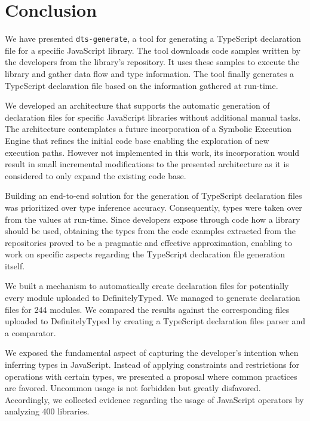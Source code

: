 \chapter{Conclusion}\label{chap:conclusion}

We have presented \texttt{dts-generate}, a tool for generating a TypeScript declaration file for a specific JavaScript library. The tool downloads code samples written by the developers from the library's repository. It uses these samples to execute the library and gather data flow and type information. The tool finally generates a TypeScript declaration file based on the information gathered at run-time.

We developed an architecture that supports the automatic generation of declaration files for specific JavaScript libraries without additional manual tasks. The architecture contemplates a future incorporation of a Symbolic Execution Engine that refines the initial code base enabling the exploration of new execution paths. However not implemented in this work, its incorporation would result in small incremental modifications to the presented architecture as it is considered to only expand the existing code base.

Building an end-to-end solution for the generation of TypeScript declaration files was prioritized over type inference accuracy. Consequently, types were taken over from the values at run-time. Since developers expose through code how a library should be used, obtaining the types from the code examples extracted from the repositories proved to be a pragmatic and effective approximation, enabling to work on specific aspects regarding the TypeScript declaration file generation itself.

We built a mechanism to automatically create declaration files for potentially every module uploaded to DefinitelyTyped. We managed to generate declaration files for 244 modules. We compared the results against the corresponding files uploaded to DefinitelyTyped by creating a TypeScript declaration files parser and a comparator.

We exposed the fundamental aspect of capturing the developer's intention when inferring types in JavaScript. Instead of applying constraints and restrictions for operations with certain types, we presented a proposal where common practices are favored. Uncommon usage is not forbidden but greatly disfavored. Accordingly, we collected evidence regarding the usage of JavaScript operators by analyzing 400 libraries.

